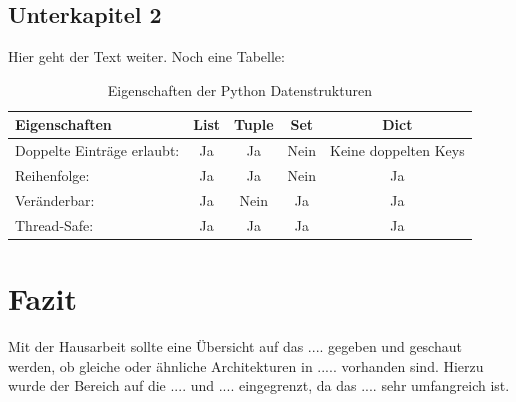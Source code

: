 \documentclass[fontsize=12pt,paper=a4,open=any,parskip=half,
  twoside=false,toc=listof,toc=bibliography,fleqn,leqno,
  captions=nooneline,captions=tableabove,british]{scrbook}
\begin{document}
\section{Unterkapitel 2}\label{ch:vector}
Hier geht der Text weiter. Noch eine Tabelle:

\begin{table}[htbp]
\caption{Eigenschaften der Python Datenstrukturen \autocite{listuple}}
\label{python-data-table}
\centering
  \begin{tabular}{l  c  c  c c} 
\toprule
    Eigenschaften & List & Tuple & Set & Dict\\ 
\midrule  
    	Doppelte Einträge erlaubt:   			& Ja  	&  Ja  		& Nein 	& Keine doppelten Keys\\
    	Reihenfolge:   						& Ja 	&  Ja 		& Nein 	& Ja\\ 
	Veränderbar:   						& Ja	&  Nein 	& Ja 		& Ja\\ 
	Thread-Safe:   						& Ja 	& Ja 	& Ja 		& Ja\\ 
  \end{tabular}

\end{table}

\chapter{Fazit}\label{ch:fazit}
Mit der Hausarbeit sollte eine Übersicht auf das .... gegeben und geschaut werden, ob gleiche oder ähnliche Architekturen in ..... vorhanden sind. Hierzu wurde der Bereich auf die .... und .... eingegrenzt, da das .... sehr umfangreich ist. \par



\printbibliography[title=Literaturverzeichnis]
\end{document}
